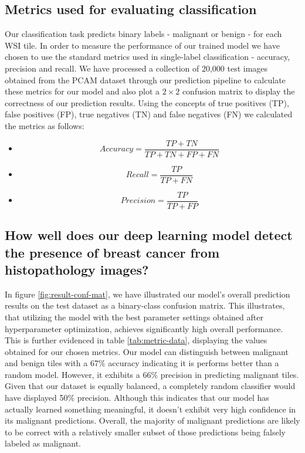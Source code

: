 \documentclass{l4proj}
\begin{document}
\subsection{Metrics used for evaluating classification}
Our classification task predicts binary labels - malignant or benign - for each WSI tile. In order to measure the performance of our trained model we have chosen to use the standard metrics used in single-label classification - accuracy, precision and recall. We have processed a collection of 20,000 test images obtained from the PCAM dataset through our prediction pipeline to calculate these metrics for our model and also plot a \(2 \times 2\) confusion matrix to display the correctness of our prediction results. Using the concepts of true positives (TP), false positives (FP), true negatives (TN) and false negatives (FN) we calculated the metrics as follows:
\begin{itemize}
    \item[] \begin{equation}
        Accuracy = \frac{TP + TN}{TP + TN + FP + FN}
    \end{equation}

    \item[] \begin{equation}
        Recall = \frac{TP}{TP + FN}
    \end{equation}

    \item[] \begin{equation}
        Precision = \frac{TP}{TP + FP}
    \end{equation}
\end{itemize}

\subsection{How well does our deep learning model detect the presence of breast cancer from histopathology images?}
In figure \ref{fig:result-conf-mat}, we have illustrated our model's overall prediction results on the test dataset as a binary-class confusion matrix. This illustrates, that utilizing the model with the best parameter settings obtained after hyperparameter optimization, achieves significantly high overall performance. This is further evidenced in table \ref{tab:metric-data}, displaying the values obtained for our chosen metrics. Our model can distinguish between malignant and benign tiles with a 67\% accuracy indicating it is performs better than a random model. However, it exhibits a 66\% precision in predicting malignant tiles. Given that our dataset is equally balanced, a completely random classifier would have displayed 50\% precision. Although this indicates that our model has actually learned something meaningful, it doesn't exhibit very high confidence in its malignant predictions. Overall, the majority of malignant predictions are likely to be correct with a relatively smaller subset of those predictions being falsely labeled as malignant.
\end{document}
